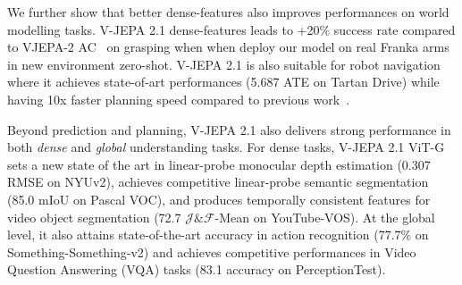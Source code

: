 \documentclass[]{fairmeta}
\begin{document}
We further show that better dense-features also improves performances on world modelling tasks. V-JEPA 2.1 dense-features leads to +20\% success rate compared to VJEPA-2 AC~\citep{assran2025v} on grasping when when deploy our model on real Franka arms in new environment zero-shot. V-JEPA 2.1 is also suitable for robot navigation where it achieves state-of-art performances  (5.687 ATE on Tartan Drive) while having 10x faster planning speed compared to previous work~\citep{Bar_2025_CVPR}.


Beyond prediction and planning, V-JEPA 2.1 also delivers strong performance in both \emph{dense} and \emph{global} understanding tasks. For dense tasks, V-JEPA 2.1 ViT-G sets a new state of the art in linear-probe monocular depth estimation (0.307 RMSE on NYUv2), achieves competitive linear-probe semantic segmentation (85.0 mIoU on Pascal VOC), and produces temporally consistent features for video object segmentation (72.7 $\mathcal{J}\&\mathcal{F}$-Mean on YouTube-VOS). At the global level, it also attains state-of-the-art accuracy in action recognition (77.7\% on Something-Something-v2) and achieves competitive performances in Video Question Answering (VQA) tasks (83.1 accuracy on PerceptionTest).




\end{document}

